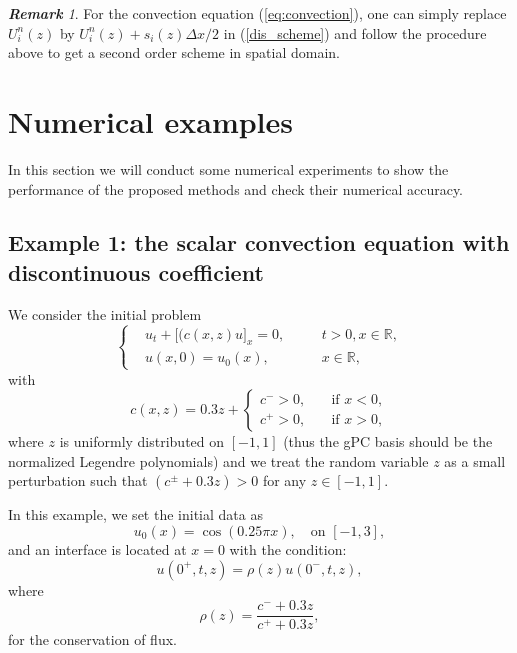 \documentclass[12pt]{article}
\theoremstyle{plain}
\theoremstyle{remark}
\newtheorem{remark}{\bf{Remark}}[section]
\theoremstyle{remark}
\theoremstyle{remark}
\numberwithin{equation}{section}
\newcommand{\R}{{\mathbb{R}}}
\newcommand{\Dx}{\Delta x}
\begin{document}
\begin{remark}
  For the convection equation (\ref{eq:convection}), one can simply replace $U_i^n(z)$ by $U_i^n(z) + s_i(z)\Dx/2$ in (\ref{dis_scheme}) and follow the procedure above to get a second order scheme in spatial domain.
\end{remark}
\section{Numerical examples}

In this section we will conduct some numerical experiments to show the performance of the proposed methods and check their numerical accuracy.

\subsection{Example 1: the scalar convection equation with discontinuous coefficient}
We consider the initial problem
\begin{equation}
  \left\{
  \begin{aligned}
    &u_t + \big[(c(x,z)u\big]_x=0, &\quad& t>0, x\in\R, \\
    &u(x,0) = u_0(x), &&x\in\R,
  \end{aligned}
  \right.
\end{equation}
with
\begin{equation}
    c(x,z) = 0.3z + 
    \begin{cases}
        c^- > 0, \quad &\text{if $x < 0$},\\
        c^+ > 0, \quad &\text{if $x > 0$},
    \end{cases}
\end{equation}
where $z$ is uniformly distributed on $[-1,1]$ (thus the gPC basis should be the normalized Legendre polynomials) and we treat the random variable $z$ as a small perturbation such that $(c^{\pm} + 0.3z) > 0$ for any $z\in[-1,1]$. 

In this example, we set the initial data as
\begin{equation}
  u_0(x) = \cos (0.25\pi x), \quad \text{on $[-1,3]$},
\end{equation}
and an interface is located at $x=0$ with the condition:
\begin{equation}
  u(0^+, t, z) = \rho(z) u(0^-, t, z),
\end{equation}
where 
\begin{equation}
  \rho(z) = \frac{c^- + 0.3z}{c^+ + 0.3z},
\end{equation}
for the conservation of flux.
\end{document}

